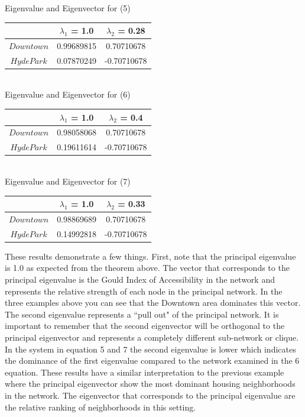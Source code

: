 \documentclass{article}
\theoremstyle{definition}
\theoremstyle{remark}
\begin{document}
\begin{center}
Eigenvalue and Eigenvector for (5) \\
\begin{tabular}{||c | c c ||} 
 \hline
 & $\lambda_1$ = 1.0 & $\lambda_2$ = 0.28\\[0.5ex] 
 \hline\hline
 $Downtown$ & 0.99689815 & 0.70710678\\
 $Hyde Park$ & 0.07870249 & -0.70710678  \\ 
 \hline
 \end{tabular} \\ 
 \vspace{0.5cm}
Eigenvalue and Eigenvector for (6) \\
\begin{tabular}{||c | c c ||} 
 \hline
 & $\lambda_1$ = 1.0 & $\lambda_2$ = 0.4\\[0.5ex] 
 \hline\hline
 $Downtown$ & 0.98058068 & 0.70710678 \\
 $Hyde Park$ & 0.19611614 & -0.70710678  \\ 
 \hline
 \end{tabular} \\ 
\vspace{0.5cm} 
Eigenvalue and Eigenvector for (7) \\
\begin{tabular}{||c | c c ||} 
 \hline
 & $\lambda_1$ = 1.0 & $\lambda_2$ = 0.33\\[0.5ex] 
 \hline\hline
 $Downtown$ & 0.98869689 & 0.70710678 \\
 $Hyde Park$ & 0.14992818 & -0.70710678  \\ 
 \hline
 \end{tabular}
 \end{center}

These results demonstrate a few things.  First, note that the principal eigenvalue is 1.0 as expected from the theorem above.  The vector that corresponds to the principal eigenvalue is the Gould Index of Accessibility in the network and represents the relative strength of each node in the principal network.  In the three examples above you can see that the Downtown area dominates this vector.  The second eigenvalue represents a ``pull out" of the principal network.  It is important to remember that the second eigenvector will be orthogonal to the principal eigenvector and represents a completely different sub-network or clique.  In the system in equation 5 and 7 the second eigenvalue is lower which indicates the dominance of the first eigenvalue compared to the network examined in the 6 equation.  These results have a similar interpretation to the previous example where the principal eigenvector show the most dominant housing neighborhoods in the network.  The eigenvector that corresponds to the principal eigenvalue are the relative ranking of neighborhoods in this setting.  \\
\end{document}
